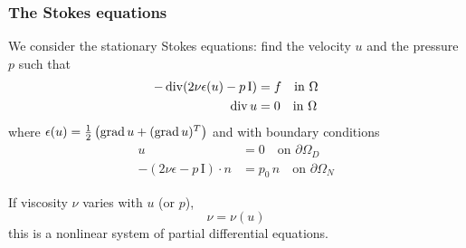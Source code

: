 \begin{frame}
  \frametitle{The Stokes equations}

  We consider the stationary Stokes equations: find the velocity $u$
  and the pressure $p$ such that
  \begin{equation*}
    \begin{split}
      - \operatorname{\mathrm{div}} (2\nu \epsilon(u) - p \, \mathrm{I}) &= f \quad \mbox{in } \Omega \\
      \operatorname{\mathrm{div}} u &= 0 \quad \mbox{in } \Omega \\
    \end{split}
  \end{equation*}
  where $\epsilon(u) = \frac{1}{2}\left(\operatorname{\mathrm{grad}} u + (\operatorname{\mathrm{grad}} u)^{T}\right)$
  and with boundary conditions
  \begin{equation*}
    \begin{split}
      u &= 0 \quad \mbox{on } \partial \Omega_D \\
      - (2\nu \epsilon - p \, \mathrm{I}) \cdot n &= p_0 \, n
      \quad \mbox{on } \partial \Omega_N
    \end{split}
  \end{equation*}

  If viscosity $\nu$ varies with $u$ (or $p$),
  \begin{equation*}
    \nu = \nu(u)
  \end{equation*}
  this is a nonlinear system of partial differential equations.
\end{frame}
